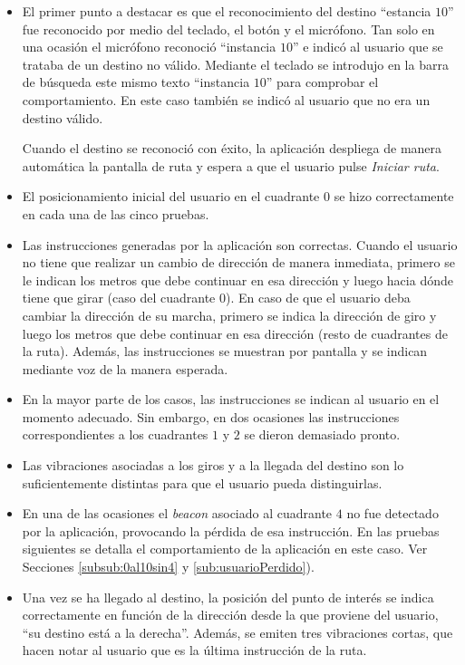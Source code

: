\begin{itemize}
	
	\item El primer punto a destacar es que el reconocimiento del destino ``estancia $10$'' fue reconocido por medio del teclado, el botón y el micrófono. Tan solo en una ocasión el micrófono reconoció ``instancia $10$'' e indicó al usuario que se trataba de un destino no válido. Mediante el teclado se introdujo en la barra de búsqueda este mismo texto ``instancia $10$'' para comprobar el comportamiento. En este caso también se indicó al usuario que no era un destino válido. 
	
	Cuando el destino se reconoció con éxito, la aplicación despliega de manera automática la pantalla de ruta y espera a que el usuario pulse \textit{Iniciar ruta}. 
	
	\item El posicionamiento inicial del usuario en el cuadrante $0$ se hizo correctamente en cada una de las cinco pruebas.
	
	\item Las instrucciones generadas por la aplicación son correctas. Cuando el usuario no tiene que realizar un cambio de dirección de manera inmediata, primero se le indican los metros que debe continuar en esa dirección y luego hacia dónde tiene que girar (caso del cuadrante $0$). En caso de que el usuario deba cambiar la dirección de su marcha, primero se indica la dirección de giro y luego los metros que debe continuar en esa dirección (resto de cuadrantes de la ruta). Además, las instrucciones se muestran por pantalla y se indican mediante voz de la manera esperada.
	
	\item En la mayor parte de los casos, las instrucciones se indican al usuario en el momento adecuado. Sin embargo, en dos ocasiones las instrucciones correspondientes a los cuadrantes $1$ y $2$ se dieron demasiado pronto. 
	
	\item Las vibraciones asociadas a los giros y a la llegada del destino son lo suficientemente distintas para que el usuario pueda distinguirlas.
	
	\item En una de las ocasiones el \textit{beacon} asociado al cuadrante $4$ no fue detectado por la aplicación, provocando la pérdida de esa instrucción. En las pruebas siguientes se detalla el comportamiento de la aplicación en este caso. Ver Secciones \ref{subsub:0al10sin4} y \ref{sub:usuarioPerdido}).
	
	\item Una vez se ha llegado al destino, la posición del punto de interés se indica correctamente en función de la dirección desde la que proviene del usuario, ``su destino está a la derecha''. Además, se emiten tres vibraciones cortas, que hacen notar al usuario que es la última instrucción de la ruta.
	
\end{itemize}

